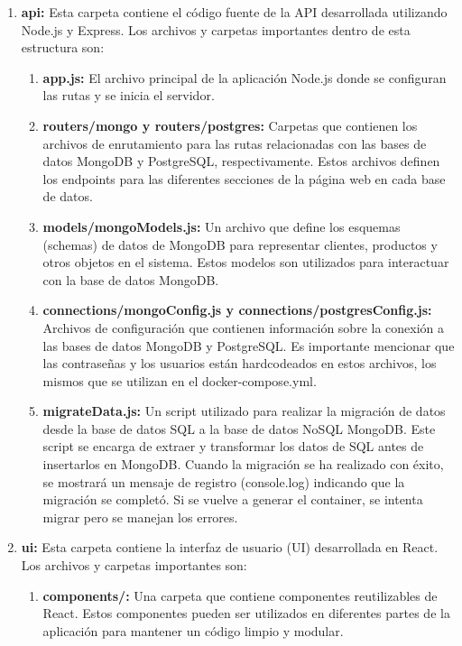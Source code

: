 \documentclass[a4paper,12pt]{article}
\begin{document}
	\begin{enumerate}
		\item \textbf{api:} Esta carpeta contiene el código fuente de la API desarrollada utilizando Node.js y Express. Los archivos y carpetas importantes dentro de esta estructura son:
		\begin{enumerate}
			\item \textbf{app.js:} El archivo principal de la aplicación Node.js donde se configuran las rutas y se inicia el servidor.
			
			\item \textbf{routers/mongo y routers/postgres:} Carpetas que contienen los archivos de enrutamiento para las rutas relacionadas con las bases de datos MongoDB y PostgreSQL, respectivamente. Estos archivos definen los endpoints para las diferentes secciones de la página web en cada base de datos.
			
			\item \textbf{models/mongoModels.js:} Un archivo que define los esquemas (schemas) de datos de MongoDB para representar clientes, productos y otros objetos en el sistema. Estos modelos son utilizados para interactuar con la base de datos MongoDB.
			
			\item \textbf{connections/mongoConfig.js y connections/postgresConfig.js:} Archivos de configuración que contienen información sobre la conexión a las bases de datos MongoDB y PostgreSQL. Es importante mencionar que las contraseñas y los usuarios están hardcodeados en estos archivos, los mismos que se utilizan en el docker-compose.yml.
			
			\item \textbf{migrateData.js:} Un script utilizado para realizar la migración de datos desde la base de datos SQL a la base de datos NoSQL MongoDB. Este script se encarga de extraer y transformar los datos de SQL antes de insertarlos en MongoDB. Cuando la migración se ha realizado con éxito, se mostrará un mensaje de registro (console.log) indicando que la migración se completó. Si se vuelve a generar el container, se intenta migrar pero se manejan los errores.
		\end{enumerate}
		\item \textbf{ui:} Esta carpeta contiene la interfaz de usuario (UI) desarrollada en React. Los archivos y carpetas importantes son:
		\begin{enumerate}
			\item \textbf{components/:} Una carpeta que contiene componentes reutilizables de React. Estos componentes pueden ser utilizados en diferentes partes de la aplicación para mantener un código limpio y modular.
			

\end{enumerate}
\end{enumerate}
\end{document}
